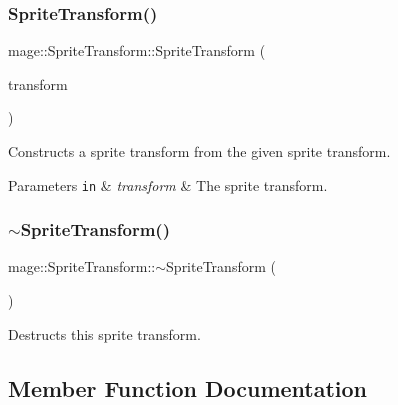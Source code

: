 \subsubsection{\texorpdfstring{Sprite\+Transform()}{SpriteTransform()}\hspace{0.1cm}{\footnotesize\ttfamily [2/2]}}
{\footnotesize\ttfamily mage\+::\+Sprite\+Transform\+::\+Sprite\+Transform (\begin{DoxyParamCaption}\item[{const \hyperlink{structmage_1_1_sprite_transform}{Sprite\+Transform} \&}]{transform }\end{DoxyParamCaption})\hspace{0.3cm}{\ttfamily [default]}}

Constructs a sprite transform from the given sprite transform.


\begin{DoxyParams}[1]{Parameters}
\mbox{\tt in}  & {\em transform} & The sprite transform. \\
\hline
\end{DoxyParams}
\hypertarget{structmage_1_1_sprite_transform_a14a3614023996cbb071c3de99f9528bc}{}\label{structmage_1_1_sprite_transform_a14a3614023996cbb071c3de99f9528bc} 
\subsubsection{\texorpdfstring{$\sim$\+Sprite\+Transform()}{~SpriteTransform()}}
{\footnotesize\ttfamily mage\+::\+Sprite\+Transform\+::$\sim$\+Sprite\+Transform (\begin{DoxyParamCaption}{ }\end{DoxyParamCaption})\hspace{0.3cm}{\ttfamily [default]}}

Destructs this sprite transform. 

\subsection{Member Function Documentation}
\hypertarget{structmage_1_1_sprite_transform_a775620fedb095a295b763b5813ef38ce}{}\label{structmage_1_1_sprite_transform_a775620fedb095a295b763b5813ef38ce} 
